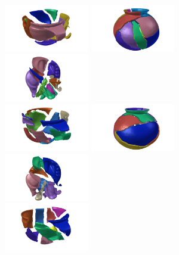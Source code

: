 \documentclass[acmlarge,screen,dvipsnames]{acmart}
\begin{document}
\begin{figure}[h]
  \includegraphics[width=0.33\textwidth]{images/ambercuppuzzle4}%
  \includegraphics[width=0.33\textwidth]{images/saltdeanpuzzle2}%
  \includegraphics[width=0.33\textwidth]{images/elephantpuzzle2}\\
  \includegraphics[width=0.33\textwidth]{images/ambercuppuzzle5}%
  \includegraphics[width=0.33\textwidth]{images/saltdeanpuzzle3}%
  \includegraphics[width=0.33\textwidth]{images/elephantpuzzle3}\\
  \includegraphics[width=0.33\textwidth]{images/ambercuppuzzle6}%

\end{figure}
\end{document}
